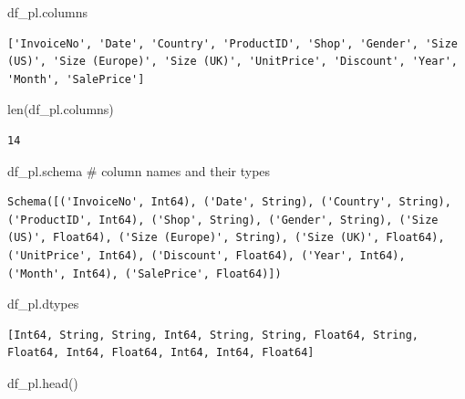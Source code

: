\documentclass[
  letterpaper,
  DIV=11,
  numbers=noendperiod]{scrreprt}
\newenvironment{Shaded}{\begin{snugshade}}{\end{snugshade}}
\newcommand{\BuiltInTok}[1]{\textcolor[rgb]{0.00,0.23,0.31}{#1}}
\newcommand{\CommentTok}[1]{\textcolor[rgb]{0.37,0.37,0.37}{#1}}
\newcommand{\NormalTok}[1]{\textcolor[rgb]{0.00,0.23,0.31}{#1}}
\begin{document}
\begin{Shaded}
\begin{Highlighting}[]
\NormalTok{df\_pl.columns}
\end{Highlighting}
\end{Shaded}

\begin{verbatim}
['InvoiceNo', 'Date', 'Country', 'ProductID', 'Shop', 'Gender', 'Size (US)', 'Size (Europe)', 'Size (UK)', 'UnitPrice', 'Discount', 'Year', 'Month', 'SalePrice']
\end{verbatim}

\begin{Shaded}
\begin{Highlighting}[]
\BuiltInTok{len}\NormalTok{(df\_pl.columns)}
\end{Highlighting}
\end{Shaded}

\begin{verbatim}
14
\end{verbatim}

\begin{Shaded}
\begin{Highlighting}[]
\NormalTok{df\_pl.schema }\CommentTok{\# column names and their types }
\end{Highlighting}
\end{Shaded}

\begin{verbatim}
Schema([('InvoiceNo', Int64), ('Date', String), ('Country', String), ('ProductID', Int64), ('Shop', String), ('Gender', String), ('Size (US)', Float64), ('Size (Europe)', String), ('Size (UK)', Float64), ('UnitPrice', Int64), ('Discount', Float64), ('Year', Int64), ('Month', Int64), ('SalePrice', Float64)])
\end{verbatim}

\begin{Shaded}
\begin{Highlighting}[]
\NormalTok{df\_pl.dtypes}
\end{Highlighting}
\end{Shaded}

\begin{verbatim}
[Int64, String, String, Int64, String, String, Float64, String, Float64, Int64, Float64, Int64, Int64, Float64]
\end{verbatim}

\begin{Shaded}
\begin{Highlighting}[]
\NormalTok{df\_pl.head()}
\end{Highlighting}
\end{Shaded}
\end{document}
